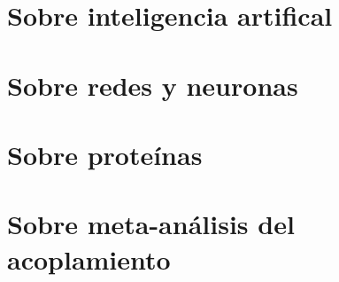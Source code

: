 \documentclass[letterpaper,12pt]{book}
\begin{document}
\frontmatter
    
    \tableofcontents
    

\mainmatter
    \chapter{Sobre inteligencia artifical}
        
    \chapter{Sobre redes y neuronas}
        
    \chapter{Sobre proteínas}
        
    \chapter{Sobre meta-análisis del acoplamiento}
        




\backmatter
    \nocite{*}
    \printbibliography
\end{document}
